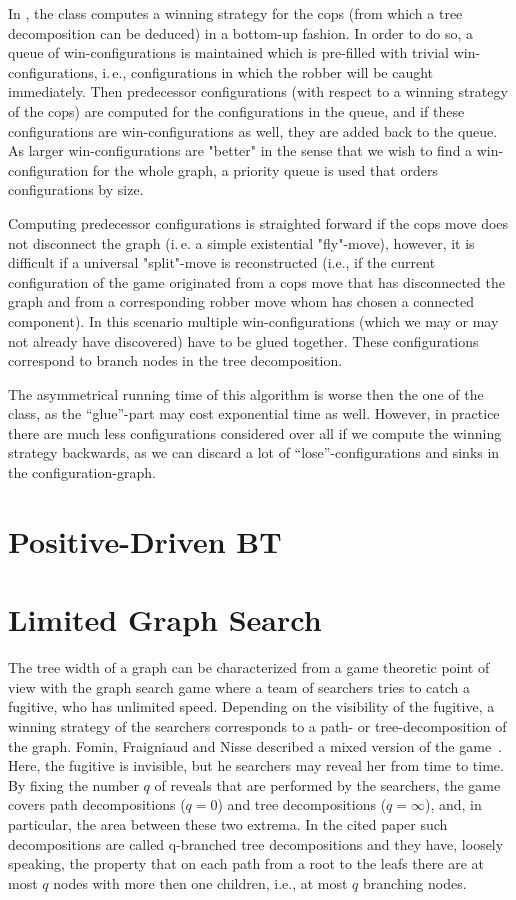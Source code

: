 \documentclass[a4paper, ukenglish, twoside, openright]{jdrasilmanual}
\begin{document}
In \Jdrasil, the class  computes a winning strategy for the cops (from which a tree
decomposition can be deduced) in a bottom-up fashion.  In order to do
so, a queue of win-configurations is maintained which is pre-filled
with trivial win-configurations, i.\,e., configurations in which the
robber will be caught immediately. Then predecessor configurations
(with respect to a winning strategy of the cops) are computed for the
configurations in the queue, and if these configurations are
win-configurations as well, they are added back to the queue.  As larger
win-configurations are "better" in the sense that we wish to find a
win-configuration for the whole graph, a priority queue is used that
orders configurations by size.
 
Computing predecessor configurations is straighted forward if the cops
move does not disconnect the graph (i.\,e. a simple existential
"fly"-move), however, it is difficult if a universal "split"-move is
reconstructed (i.e., if the current configuration of the game
originated from a cops move that has disconnected the graph and from a
corresponding robber move whom has chosen a connected component). In
this scenario multiple win-configurations (which we may or may not
already have discovered) have to be glued together. These
configurations correspond to branch nodes in the tree decomposition.

The asymmetrical running time of this algorithm is worse then the one
of the  class, as the ``glue''-part may cost
exponential time as well. However, in practice there are much less
configurations considered over all if we compute the winning strategy
backwards, as we can discard a lot of ``lose''-configurations and
sinks in the configuration-graph.

\section{Positive-Driven BT}

\section{Limited Graph Search}
The tree width of a graph can be characterized from a game theoretic
point of view with the graph search game where a team of searchers
tries to catch a fugitive, who has unlimited speed. Depending on the
visibility of the fugitive, a winning strategy of the searchers
corresponds to a path- or tree-decomposition of the graph. Fomin,
Fraigniaud and Nisse described a mixed version of the game~\cite{FominFN09}.
Here, the fugitive is invisible, but he searchers may reveal her from
time to time. By fixing the number \(q\) of reveals that are performed
by the searchers, the game covers path decompositions (\(q=0\)) and
tree decompositions (\(q=\infty\)), and, in particular, the area
between these two extrema. In the cited paper such decompositions are
called q-branched tree decompositions and they have, loosely speaking,
the property that on each path from a root to the leafs there are at
most \(q\) nodes with more then one children, i.e., at most \(q\)
branching nodes.
\end{document}
